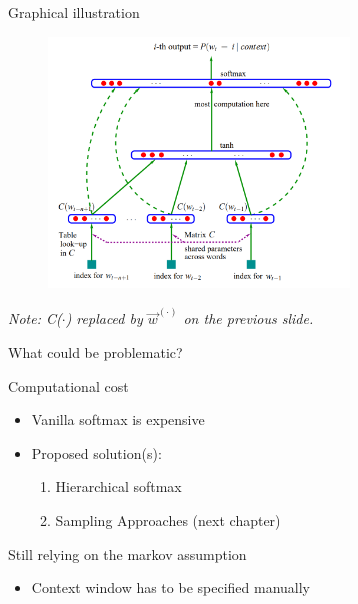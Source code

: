 \begin{frame}{Graphical illustration}

\vfill

\begin{figure}
    \centering
    \includegraphics[width=8cm]{figure/bengio03.png}\\
\end{figure}

\scriptsize{\textit{Note: C($\cdot$) replaced by $\vec w^{(\cdot)}$ on the previous slide.}}

\vfill

\end{frame}


\begin{frame}{What could be problematic?}

\vfill

\begin{block}{Computational cost}
    \begin{itemize}
        \item Vanilla softmax is expensive
        \item Proposed solution(s): 
        \begin{enumerate}
            \item Hierarchical softmax 
            \item Sampling Approaches (next chapter)
        \end{enumerate}
    \end{itemize}
\end{block}
\begin{block}{Still relying on the markov assumption}
    \begin{itemize}
        \item Context window has to be specified manually
    \end{itemize}
\end{block}

\vfill

\end{frame}


\endlecture

